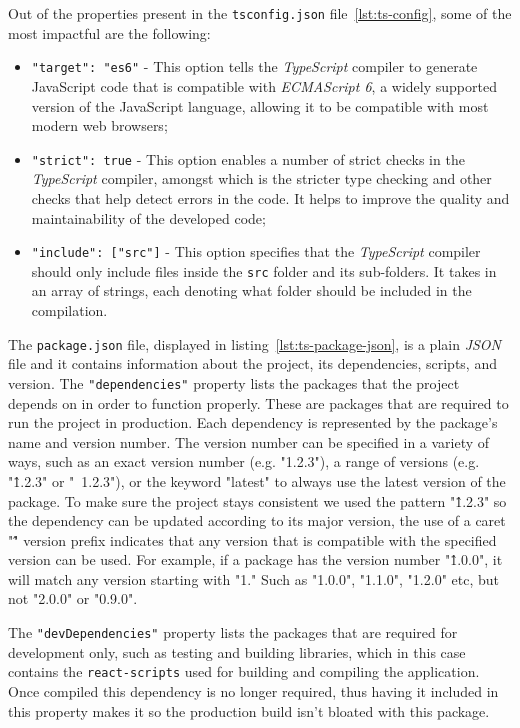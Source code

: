 Out of the properties present in the \lstinline{tsconfig.json} file~\ref{lst:ts-config}, some of the most impactful are the following:
\begin{itemize}
    \item \lstinline{"target": "es6"} - This option tells the \textit{TypeScript} compiler to generate JavaScript code that is compatible with \textit{ECMAScript 6}, a widely supported version of the JavaScript language, allowing it to be compatible with most modern web browsers;

    \item \lstinline{"strict": true} - This option enables a number of strict checks in the \textit{TypeScript} compiler, amongst which is the stricter type checking and other checks that help detect errors in the code. It helps to improve the quality and maintainability of the developed code;

    \item \lstinline{"include": ["src"]} - This option specifies that the \textit{TypeScript} compiler should only include files inside the \texttt{src} folder and its sub-folders. It takes in an array of strings, each denoting what folder should be included in the compilation.
\end{itemize}


The \lstinline{package.json} file, displayed in listing~\ref{lst:ts-package-json}, is a plain \textit{JSON} file and it contains information about the project, its dependencies, scripts, and version. The \lstinline{"dependencies"} property lists the packages that the project depends on in order to function properly. 
These are packages that are required to run the project in production. Each dependency is represented by the package's name and version number. The version number can be specified in a variety of ways, such as an exact version number (e.g. "1.2.3"), a range of versions (e.g. "\^ 1.2.3" or "~1.2.3"), or the keyword "latest" to always use the latest version of the package. To make sure the project stays consistent we used the pattern "\^ 1.2.3" so the dependency can be updated according to its major version, the use of a caret "\^" version prefix indicates that any version that is compatible with the specified version can be used. For example, if a package has the version number "\^ 1.0.0", it will match any version starting with "1." Such as "1.0.0", "1.1.0", "1.2.0" etc, but not "2.0.0" or "0.9.0".


The \lstinline{"devDependencies"} property lists the packages that are required for development only, such as testing and building libraries, which in this case contains the \lstinline{react-scripts} used for building and compiling the application. Once compiled this dependency is no longer required, thus having it included in this property makes it so the production build isn't bloated with this package.

